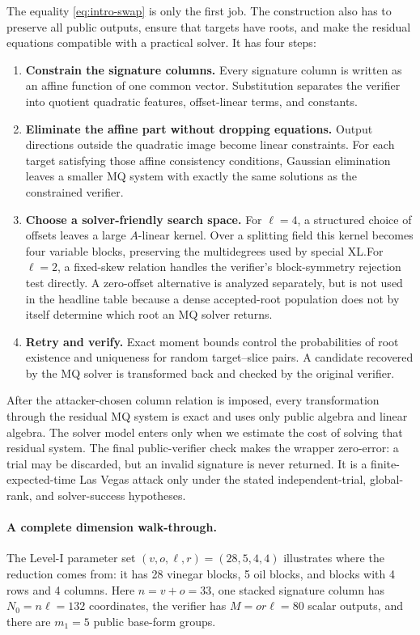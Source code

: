 \documentclass[11pt]{article}
\begin{document}
The equality \eqref{eq:intro-swap} is only the first job.  The construction
also has to preserve all public outputs, ensure that targets have roots, and
make the residual equations compatible with a practical solver.  It has four
steps:
\begin{enumerate}[label=\textbf{\arabic*.},itemsep=3pt]
\item \textbf{Constrain the signature columns.}  Every signature column is
      written as an affine function of one common vector.  Substitution
      separates the verifier into quotient quadratic features, offset-linear
      terms, and constants.
\item \textbf{Eliminate the affine part without dropping equations.}  Output
      directions outside the quadratic image become linear constraints.  For
      each target satisfying those affine consistency conditions, Gaussian
      elimination leaves a smaller MQ system with exactly the same solutions
      as the constrained verifier.
\item \textbf{Choose a solver-friendly search space.}  For $\ell=4$, a
      structured choice of offsets leaves a large $A$-linear kernel.  Over a
      splitting field this kernel becomes four variable blocks, preserving the
      multidegrees used by special XL.\@  For $\ell=2$, a fixed-skew relation
      handles the verifier's block-symmetry rejection test directly.  A
      zero-offset alternative is analyzed separately, but is not used in the
      headline table because a dense accepted-root population does not by
      itself determine which root an MQ solver returns.
\item \textbf{Retry and verify.}  Exact moment bounds control the
      probabilities of root existence and uniqueness for random target--slice
      pairs.  A candidate recovered by the MQ solver is transformed back and
      checked by the original verifier.
\end{enumerate}

After the attacker-chosen column relation is imposed, every transformation
through the residual MQ system is exact and uses only public algebra and
linear algebra.  The solver model enters only when we estimate the cost of
solving that residual system.  The final public-verifier check makes the
wrapper zero-error: a trial may be discarded, but an invalid signature is
never returned.  It is a finite-expected-time Las Vegas attack only under the
stated independent-trial, global-rank, and solver-success hypotheses.

\paragraph{A complete dimension walk-through.}
The Level-I parameter set $(v,o,\ell,r)=(28,5,4,4)$ illustrates where the
reduction comes from: it has 28 vinegar blocks, 5 oil blocks, and blocks with
4 rows and 4 columns.  Here $n=v+o=33$, one stacked signature column has
$N_0=n\ell=132$ coordinates, the verifier has $M=or\ell=80$ scalar outputs,
and there are $m_1=5$ public base-form groups.
\end{document}
